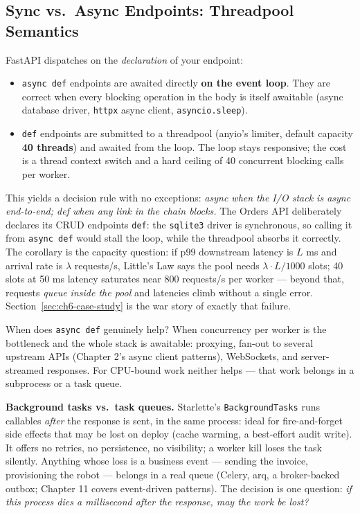 \subsection{Sync vs.\ Async Endpoints: Threadpool Semantics}
\label{sec:ch6-sync-async}

FastAPI dispatches on the \emph{declaration} of your endpoint:

\begin{itemize}
  \item \texttt{async def} endpoints are awaited directly \textbf{on the
        event loop}. They are correct when every blocking operation in the
        body is itself awaitable (async database driver, \texttt{httpx}
        async client, \texttt{asyncio.sleep}).
  \item \texttt{def} endpoints are submitted to a threadpool
        (anyio's limiter, default capacity \textbf{40 threads}) and awaited
        from the loop. The loop stays responsive; the cost is a thread
        context switch and a hard ceiling of 40 concurrent blocking calls per
        worker.
\end{itemize}

This yields a decision rule with no exceptions: \emph{async when the I/O
stack is async end-to-end; def when any link in the chain blocks.} The
Orders API deliberately declares its CRUD endpoints \texttt{def}: the
\texttt{sqlite3} driver is synchronous, so calling it from
\texttt{async def} would stall the loop, while the threadpool absorbs it
correctly. The corollary is the capacity question: if p99 downstream latency
is $L$ ms and arrival rate is $\lambda$ requests/s, Little's Law says the
pool needs $\lambda \cdot L / 1000$ slots; 40 slots at 50 ms latency
saturates near 800 requests/s per worker --- beyond that, requests
\emph{queue inside the pool} and latencies climb without a single error.
Section~\ref{sec:ch6-case-study} is the war story of exactly that failure.

When does \texttt{async def} genuinely help? When concurrency per worker is
the bottleneck and the whole stack is awaitable: proxying, fan-out to several
upstream APIs (Chapter 2's async client patterns), WebSockets, and
server-streamed responses. For CPU-bound work neither helps --- that work
belongs in a subprocess or a task queue.

\textbf{Background tasks vs.\ task queues.} Starlette's
\texttt{BackgroundTasks} runs callables \emph{after} the response is sent, in
the same process: ideal for fire-and-forget side effects that may be lost on
deploy (cache warming, a best-effort audit write). It offers no retries, no
persistence, no visibility; a worker kill loses the task silently. Anything
whose loss is a business event --- sending the invoice, provisioning the
robot --- belongs in a real queue (Celery, arq, a broker-backed outbox;
Chapter 11 covers event-driven patterns). The decision is one question:
\emph{if this process dies a millisecond after the response, may the work be
lost?}

